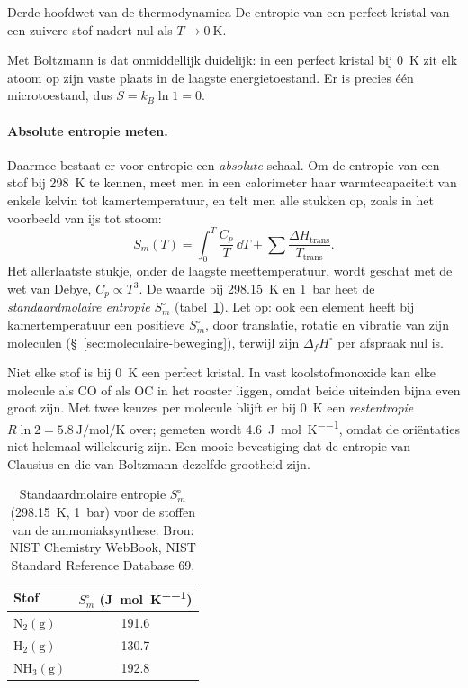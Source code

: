 \begin{definitie}{Derde hoofdwet van de thermodynamica}
De entropie van een perfect kristal van een zuivere stof nadert nul als $T \to \SI{0}{\kelvin}$.
\end{definitie}

Met Boltzmann is dat onmiddellijk duidelijk: in een perfect kristal bij \SI{0}{\kelvin} zit elk atoom op zijn vaste plaats in de laagste energietoestand. Er is precies \'e\'en microtoestand, dus $S = k_B\ln 1 = 0$.

\paragraph{Absolute entropie meten.} Daarmee bestaat er voor entropie een \emph{absolute} schaal. Om de entropie van een stof bij \SI{298}{\kelvin} te kennen, meet men in een calorimeter haar warmtecapaciteit van enkele kelvin tot kamertemperatuur, en telt men alle stukken op, zoals in het voorbeeld van ijs tot stoom:
\[
S_m(T) = \int_0^{T}\frac{C_p}{T}\,\dd T + \sum \frac{\Delta H_\text{trans}}{T_\text{trans}} .
\]
Het allerlaatste stukje, onder de laagste meettemperatuur, wordt geschat met de wet van Debye, $C_p \propto T^3$. De waarde bij \SI{298.15}{\kelvin} en \SI{1}{\bar} heet de \emph{standaardmolaire entropie} $S_m^\circ$ (tabel~\ref{tab:standaardentropie}). Let op: ook een element heeft bij kamertemperatuur een positieve $S_m^\circ$, door translatie, rotatie en vibratie van zijn moleculen (\S~\ref{sec:moleculaire-beweging}), terwijl zijn $\Delta_fH^\circ$ per afspraak nul is.

Niet elke stof is bij \SI{0}{\kelvin} een perfect kristal. In vast koolstofmonoxide kan elke molecule als CO of als OC in het rooster liggen, omdat beide uiteinden bijna even groot zijn. Met twee keuzes per molecule blijft er bij \SI{0}{\kelvin} een \emph{restentropie} $R\ln 2 = \SI{5.8}{\joule\per\mole\per\kelvin}$ over; gemeten wordt \SI{4.6}{\joule\per\mole\per\kelvin}, omdat de ori\"entaties niet helemaal willekeurig zijn. Een mooie bevestiging dat de entropie van Clausius en die van Boltzmann dezelfde grootheid zijn.

\begin{table}[htb]
\centering
\caption{Standaardmolaire entropie $S_m^\circ$ (\SI{298.15}{\kelvin}, \SI{1}{\bar}) voor de stoffen van de ammoniaksynthese. Bron: NIST Chemistry WebBook, NIST Standard Reference Database 69.}
\label{tab:standaardentropie}
\begin{tabular}{lc}
\toprule
Stof & $S_m^\circ$ (\si{\joule\per\mole\per\kelvin}) \\
\midrule
$\mathrm{N_2(g)}$ & 191.6 \\
$\mathrm{H_2(g)}$ & 130.7 \\
$\mathrm{NH_3(g)}$ & 192.8 \\
\bottomrule
\end{tabular}
\end{table}

